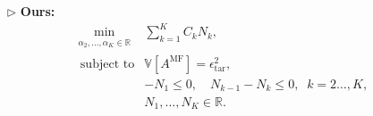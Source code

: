 \documentclass{beamer}
\begin{document}
\begin{frame}[t]
\begin{itemize}[leftmargin=5pt]
        \item[$\triangleright$] \textcolor{myblue3}{\bf  Ours:}
        {\footnotesize
        \begin{equation*}\label{eq:Optimization_pb_sample_size}
            \begin{array}{ll}
            \min \limits_{\begin{array}{c}
        \scriptstyle \alpha_2,\ldots,\alpha_K\in \mathbb{R}
        \end{array}} &\sum\limits_{k=1}^K C_kN_k,\\
               \;\,\text{subject to} &\displaystyle\mathbb{V}\left[A^{\text{MF}}\right]=\epsilon_{\text{tar}}^2,\\[2pt]
               &\displaystyle -N_1\le 0,\quad \displaystyle N_{k-1}-N_k\le 0, \;\; k=2\ldots,K,\\
               &N_1,\ldots, N_K\in \mathbb{R}. 
            \end{array}
        \end{equation*}
        }
        
    \end{itemize}
\end{frame}
\end{document}
